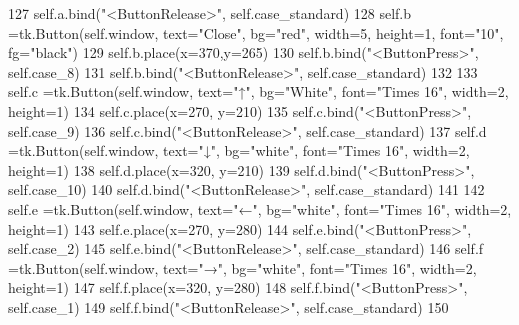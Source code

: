 \begin{DoxyCode}
127         self.a.bind(\textcolor{stringliteral}{"<ButtonRelease>"}, self.case\_standard)
128         self.b =tk.Button(self.window, text=\textcolor{stringliteral}{"Close"}, bg=\textcolor{stringliteral}{"red"}, width=5, height=1, font=\textcolor{stringliteral}{"10"}, fg=\textcolor{stringliteral}{"black"})
129         self.b.place(x=370,y=265)
130         self.b.bind(\textcolor{stringliteral}{"<ButtonPress>"}, self.case\_8)
131         self.b.bind(\textcolor{stringliteral}{"<ButtonRelease>"}, self.case\_standard)
132 
133         self.c =tk.Button(self.window, text=\textcolor{stringliteral}{"↑"}, bg=\textcolor{stringliteral}{"White"}, font=\textcolor{stringliteral}{"Times 16"}, width=2, height=1)
134         self.c.place(x=270, y=210)
135         self.c.bind(\textcolor{stringliteral}{"<ButtonPress>"}, self.case\_9)
136         self.c.bind(\textcolor{stringliteral}{"<ButtonRelease>"}, self.case\_standard)
137         self.d =tk.Button(self.window, text=\textcolor{stringliteral}{"↓"}, bg=\textcolor{stringliteral}{"white"}, font=\textcolor{stringliteral}{"Times 16"}, width=2, height=1)
138         self.d.place(x=320, y=210)
139         self.d.bind(\textcolor{stringliteral}{"<ButtonPress>"}, self.case\_10)
140         self.d.bind(\textcolor{stringliteral}{"<ButtonRelease>"}, self.case\_standard)
141 
142         self.e =tk.Button(self.window, text=\textcolor{stringliteral}{"←"}, bg=\textcolor{stringliteral}{"white"}, font=\textcolor{stringliteral}{"Times 16"}, width=2, height=1)
143         self.e.place(x=270, y=280) 
144         self.e.bind(\textcolor{stringliteral}{"<ButtonPress>"}, self.case\_2)
145         self.e.bind(\textcolor{stringliteral}{"<ButtonRelease>"}, self.case\_standard)
146         self.f =tk.Button(self.window, text=\textcolor{stringliteral}{"→"}, bg=\textcolor{stringliteral}{"white"}, font=\textcolor{stringliteral}{"Times 16"}, width=2, height=1)
147         self.f.place(x=320, y=280)
148         self.f.bind(\textcolor{stringliteral}{"<ButtonPress>"}, self.case\_1)
149         self.f.bind(\textcolor{stringliteral}{"<ButtonRelease>"}, self.case\_standard)     
150   
\end{DoxyCode}
\mbox{\label{class_f_i_n_a_l___g_u_i___w_l_a_n_1_1_w_l_a_n_a2253446c57d221d8374f492d3b039edf}} 
